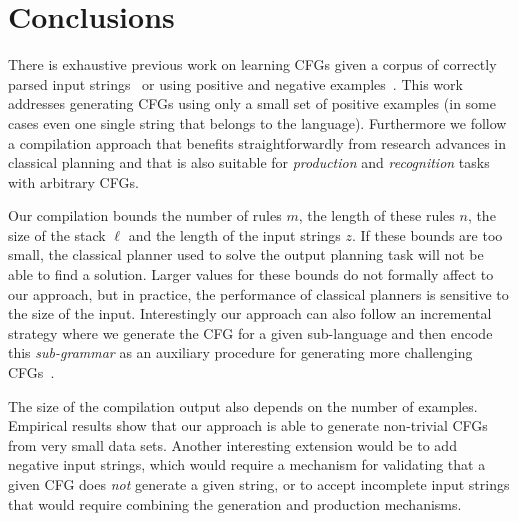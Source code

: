 \documentclass[letterpaper]{article} %
\begin{document}
\section{Conclusions}
There is exhaustive previous work on learning CFGs given a corpus of correctly parsed input strings~\cite{sakakibara1992efficient,langley2000learning} or using positive and negative examples~\cite{de2010grammatical,muggleton2014meta}. This work addresses generating CFGs using only a small set of positive examples (in some cases even one single string that belongs to the language). Furthermore we follow a compilation approach that benefits straightforwardly from research advances in classical planning and that is also suitable for {\it production} and {\it recognition} tasks with arbitrary CFGs.

Our compilation bounds the number of rules $m$, the length of these rules $n$, the size of the stack $\ell$ and the length of the input strings $z$. If these bounds are too small, the classical planner used to solve the output planning task will not be able to find a solution. Larger values for these bounds do not formally affect to our approach, but in practice, the performance of classical planners is sensitive to the size of the input. Interestingly our approach can also follow an incremental strategy where we generate the CFG for a given sub-language and then encode this {\it sub-grammar} as an auxiliary procedure for generating more challenging CFGs~\cite{segovia2016hierarchical}. 

The size of the compilation output also depends on the number of examples. Empirical results show that our approach is able to generate non-trivial CFGs from very small data sets. Another interesting extension would be to add negative input strings, which would require a mechanism for validating that a given CFG does {\em not} generate a given string, or to accept incomplete input strings that would require combining the generation and production mechanisms.









\end{document}
